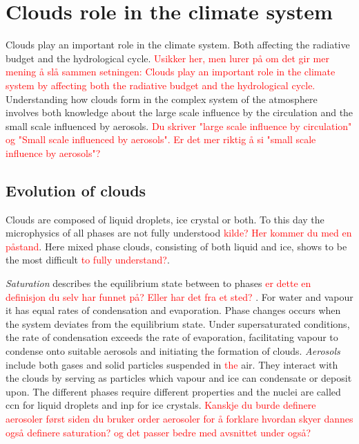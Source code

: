 \section{Clouds role in the climate system} \label{sec:cloud_in_climate_system}
Clouds play an important role in the climate system. Both affecting the radiative budget and the hydrological cycle. \textcolor{red}{Usikker her, men lurer på om det gir mer mening å slå sammen setningen: Clouds play an important role in the climate system by affecting both the radiative budget and the hydrological cycle. } Understanding how clouds form in the complex system of the atmosphere involves both knowledge about the large scale influence by the circulation and the small scale influenced by aerosols. \textcolor{red}{Du skriver "large scale influence by circulation" og "Small scale influenced by aerosols". Er det mer riktig å si "small scale influence by aerosols"?} 
\subsection{Evolution of clouds}
Clouds are composed of liquid droplets, ice crystal or both. To this day the microphysics of all phases are not fully understood \textcolor{red}{kilde? Her kommer du med en påstand}. Here mixed phase clouds, consisting of both liquid and ice, shows to be the most difficult \textcolor{red}{to fully understand?}. 

\textit{Saturation} describes the equilibrium state between to phases \textcolor{red}{er dette en definisjon du selv har funnet på? Eller har det fra et sted? }. For water and vapour it has equal rates of condensation and evaporation. Phase changes occurs when the system deviates from the equilibrium state. Under supersaturated conditions, the rate of condensation exceeds the rate of evaporation, facilitating vapour to condense onto suitable aerosols and initiating the formation of clouds. 
\textit{Aerosols} include both gases and solid particles suspended in \textcolor{red}{the} air. They interact with the clouds by serving as particles which vapour and ice can condensate or deposit upon. The different phases require different properties and the nuclei are called \acrfull{ccn} for liquid droplets and \acrfull{inp} for ice crystals. 
\textcolor{red}{Kanskje du burde definere aerosoler først siden du bruker order aerosoler for å forklare hvordan skyer dannes også definere saturation? og det passer bedre med avsnittet under også?}

